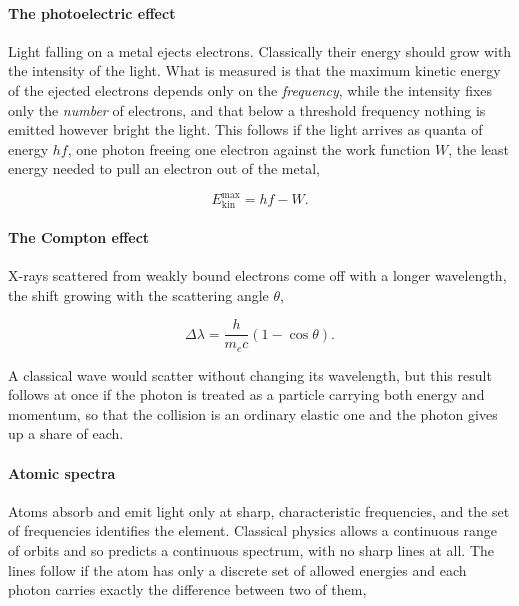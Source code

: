     \paragraph{The photoelectric effect}

    Light falling on a metal ejects electrons. Classically their energy should grow with the intensity of the light. What is measured is that the maximum kinetic energy of the ejected electrons depends only on the \emph{frequency}, while the intensity fixes only the \emph{number} of electrons, and that below a threshold frequency nothing is emitted however bright the light. This follows if the light arrives as quanta of energy $hf$, one photon freeing one electron against the work function $W$, the least energy needed to pull an electron out of the metal,

    \begin{equation*}
        E_\text{kin}^\text{max} = hf - W .
    \end{equation*}

    \paragraph{The Compton effect}

    X-rays scattered from weakly bound electrons come off with a longer wavelength, the shift growing with the scattering angle $\theta$,

    \begin{equation*}
        \Delta\lambda = \frac{h}{m_e c}\left(1 - \cos\theta\right).
    \end{equation*}

    A classical wave would scatter without changing its wavelength, but this result follows at once if the photon is treated as a particle carrying both energy and momentum, so that the collision is an ordinary elastic one and the photon gives up a share of each.

    \paragraph{Atomic spectra}

    Atoms absorb and emit light only at sharp, characteristic frequencies, and the set of frequencies identifies the element. Classical physics allows a continuous range of orbits and so predicts a continuous spectrum, with no sharp lines at all. The lines follow if the atom has only a discrete set of allowed energies and each photon carries exactly the difference between two of them,

